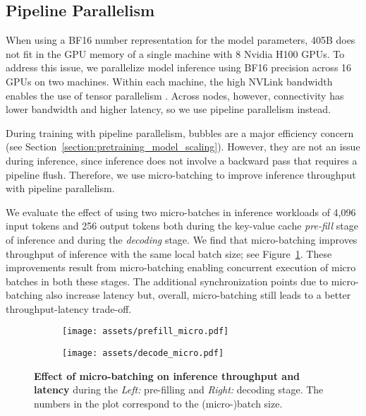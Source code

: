 \subsection{Pipeline Parallelism}
\label{section:pp}

When using a BF16 number representation for the model parameters, \llamathree 405B does not fit in the GPU memory of a single machine with 8 Nvidia H100 GPUs. 
To address this issue, we parallelize model inference using BF16 precision across 16 GPUs on two machines.
Within each machine, the high NVLink bandwidth enables the use of tensor parallelism \citep{shoeybi2019megatron}. 
Across nodes, however, connectivity has lower bandwidth and higher latency, so we use pipeline parallelism \citep{huang2019gpipe} instead.

During training with pipeline parallelism, bubbles are a major efficiency concern (see Section~\ref{section:pretraining_model_scaling}).
However, they are not an issue during inference, since inference does not involve a backward pass that requires a pipeline flush. 
Therefore, we use micro-batching to improve inference throughput with pipeline parallelism. 

We evaluate the effect of using two micro-batches in inference workloads of 4,096 input tokens and 256 output tokens both during the key-value cache \emph{pre-fill} stage of inference and during the \emph{decoding} stage.
We find that micro-batching improves throughput of inference with the same local batch size; see Figure~\ref{figure:micro-batching}.
These improvements result from micro-batching enabling concurrent execution of micro batches in both these stages.
The additional synchronization points due to micro-batching also increase latency but, overall, micro-batching still leads to a better throughput-latency trade-off.

\begin{figure}
\centering
\begin{subfigure}{.5\textwidth}
  \centering
  \texttt{[image: assets/prefill\_micro.pdf]}
\end{subfigure}%
\begin{subfigure}{.5\textwidth}
  \centering
  \texttt{[image: assets/decode\_micro.pdf]}
\end{subfigure}
\caption{\textbf{Effect of micro-batching on inference throughput and latency} during the \emph{Left:} pre-filling and \emph{Right:} decoding stage. The numbers in the plot correspond to the (micro-)batch size.}

\label{figure:micro-batching}
\end{figure}



